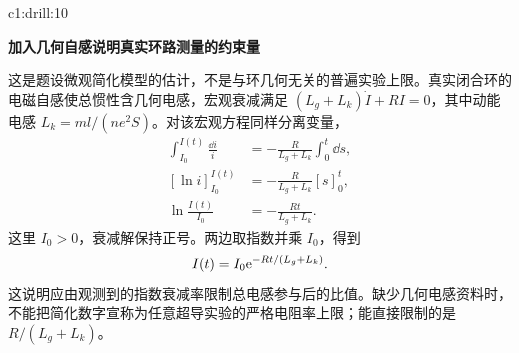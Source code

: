 \begin{drillsolution}{c1:drill:10}
\par\medskip{}\noindent\textbf{加入几何自感说明真实环路测量的约束量}\par\nobreak
这是题设微观简化模型的估计，不是与环几何无关的普遍实验上限。真实闭合环的电磁自感使总惯性含几何电感，宏观衰减满足 $(L_g+L_k)\dot I+RI=0$，其中动能电感 $L_k=m l/(ne^2S)$。对该宏观方程同样分离变量，
\[
 \begin{aligned}
 \int_{I_0}^{I(t)}\frac{\dd i}{i}
 &=-\frac{R}{L_g+L_k}\int_0^t\dd s,\\
 [\ln i]_{I_0}^{I(t)}&=-\frac{R}{L_g+L_k}[s]_0^t,\\
 \ln\frac{I(t)}{I_0}&=-\frac{Rt}{L_g+L_k}.
 \end{aligned}
\]
这里 $I_0>0$，衰减解保持正号。两边取指数并乘 $I_0$，得到
\[
 I(t)=I_0\mathrm e^{-Rt/(L_g+L_k)}.
\]
这说明应由观测到的指数衰减率限制总电感参与后的比值。缺少几何电感资料时，不能把简化数字宣称为任意超导实验的严格电阻率上限；能直接限制的是 $R/(L_g+L_k)$。\end{drillsolution}
